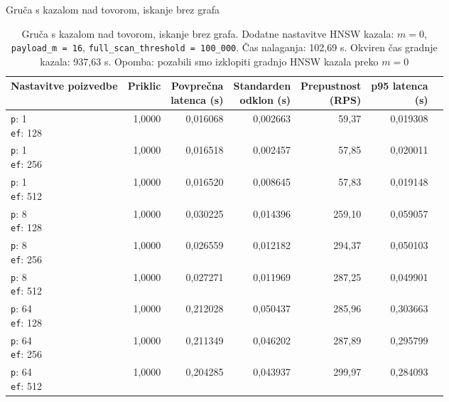 \begin{table}[htbp]
  \centering
\small
  \caption{Gruča s kazalom nad tovorom, iskanje brez grafa}
  \label{tab:cluster-2cpu-4ram:payload-fullscan:qdrant-dipl-baseline-payload-no-subgraph-fullscan-m-16-ef-128-random-768-100-tenants-extended-upload-2026-08-17-21-43-42.json}
  \begin{tabularx}{\textwidth}{Xrrrrrr}
    \toprule
    Nastavitve poizvedbe & Priklic & \makecell{Povprečna\\latenca (s)} & \makecell{Standarden\\odklon (s)} & \makecell{Prepustnost\\(RPS)} & \makecell{p95 latenca\\(s)}  \\
    \midrule
    \makecell{\texttt{p}: 1\\\texttt{ef}: 128} & 1,0000 & 0,016068 & 0,002663 & 59,37 & 0,019308 \\
    \makecell{\texttt{p}: 1\\\texttt{ef}: 256} & 1,0000 & 0,016518 & 0,002457 & 57,85 & 0,020011 \\
    \makecell{\texttt{p}: 1\\\texttt{ef}: 512} & 1,0000 & 0,016520 & 0,008645 & 57,83 & 0,019148 \\
    \makecell{\texttt{p}: 8\\\texttt{ef}: 128} & 1,0000 & 0,030225 & 0,014396 & 259,10 & 0,059057 \\
    \makecell{\texttt{p}: 8\\\texttt{ef}: 256} & 1,0000 & 0,026559 & 0,012182 & 294,37 & 0,050103 \\
    \makecell{\texttt{p}: 8\\\texttt{ef}: 512} & 1,0000 & 0,027271 & 0,011969 & 287,25 & 0,049901 \\
    \makecell{\texttt{p}: 64\\\texttt{ef}: 128} & 1,0000 & 0,212028 & 0,050437 & 285,96 & 0,303663 \\
    \makecell{\texttt{p}: 64\\\texttt{ef}: 256} & 1,0000 & 0,211349 & 0,046202 & 287,89 & 0,295799 \\
    \makecell{\texttt{p}: 64\\\texttt{ef}: 512} & 1,0000 & 0,204285 & 0,043937 & 299,97 & 0,284093 \\
    \bottomrule
  \end{tabularx}
\caption* {Gruča s kazalom nad tovorom, iskanje brez grafa. Dodatne nastavitve HNSW kazala: $m = 0$, \texttt{payload\_m = 16}, \texttt{full\_scan\_threshold = 100\_000}. Čas nalaganja: 102,69 s. Okviren čas gradnje kazala: 937,63 s. Opomba: pozabili smo izklopiti gradnjo HNSW kazala preko $m = 0$}\end{table}



